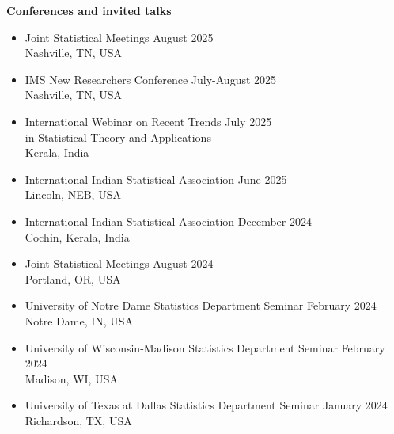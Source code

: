\documentclass[letterpaper,12pt,oneside]{article}
\theoremstyle{definition}
\begin{document}
			
			\noindent \textbf{Conferences and invited talks}
			\begin{itemize}
				
				
				\item[] Joint Statistical Meetings
				\hfill August 2025\\
				Nashville, TN, USA 
				
				\item[] IMS New Researchers Conference
				\hfill July-August 2025\\
				Nashville, TN, USA
				
				\item[] International Webinar on Recent Trends
				\hfill July 2025\\
				in Statistical Theory and Applications\\				
				Kerala, India
				
				\item[] International Indian Statistical Association
				\hfill June 2025\\
				Lincoln, NEB, USA
				
				\item[] International Indian Statistical Association
				\hfill December 2024\\
				Cochin, Kerala, India
				
				\item[] Joint Statistical Meetings
				\hfill August 2024\\
				Portland, OR, USA 
				
				\item[] University of Notre Dame Statistics Department Seminar
				\hfill February 2024\\
				Notre Dame, IN, USA
				
				\item[] University of Wisconsin-Madison Statistics Department Seminar
				\hfill February 2024\\
				Madison, WI, USA
				
				\item[] University of Texas at Dallas Statistics Department Seminar
				\hfill January 2024\\
				Richardson, TX, USA
				

\end{itemize}
\end{document}
